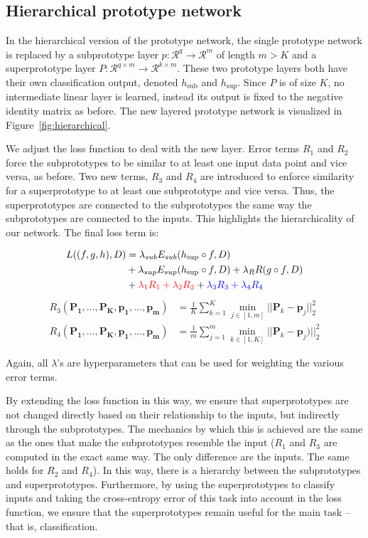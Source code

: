 \subsection{Hierarchical prototype network}
In the hierarchical version of the prototype network, the single prototype network is replaced by a subprototype layer $p : \mathcal{R}^q\rightarrow \mathcal{R}^m$ of length $m > K$ and a superprototype layer $P:\mathcal{R}^{q\times m}\rightarrow\mathcal{R}^{k\times m}$. These two prototype layers both have their own classification output, denoted $h_{\text{sub}}$ and $h_{\text{sup}}$. Since $P$ is of size $K$, no intermediate linear layer is learned, instead its output is fixed to the negative identity matrix as before. The new layered prototype network is visualized in Figure~\ref{fig:hierarchical}. 


We adjust the loss function to deal with the new layer. Error terms $R_1$ and $R_2$ force the subprototypes to be similar to at least one input data point and vice versa, as before. Two new terms, $R_3$ and $R_4$ are introduced to enforce similarity for a superprototype to at least one subprototype and vice versa. Thus, the superprototypes are connected to the subprototypes the same way the subprototypes are connected to the inputs. This highlights the hierarchicality of our network. The final loss term is:

\begin{align*}
    L((f,g,h),D) &= \lambda_{sub} E_{sub}(h_{\text{sup}} \circ f, D)\\ &+ \lambda_{sup} E_{sup}(h_{\text{sup}} \circ f, D) 
    + \lambda_R R(g \circ f,D)\\ &+ {\color{red}\lambda_1 R_1 + \lambda_2 R_2}  + {\color{blue}\lambda_3 R_3 + \lambda_4 R_4}
\end{align*}
\begin{align*}
    R_3(\bm{P_1}, \dots, \bm{P_K}, \bm{p_1}, \dots, \bm{p_m}) &= \frac{1}{K}\sum_{k=1}^K \min_{j\in [1,m]}||\bm{P}_k- \bm{p}_j||^2_2 \\
     R_4(\bm{P_1}, \dots, \bm{P_K}, \bm{p_1}, \dots, \bm{p_m}) &= \frac{1}{m}\sum_{j=1}^m \min_{k\in [1,K]}||\bm{P}_k- \bm{p}_j)||^2_2
 \end{align*}

Again, all $\lambda$'s are hyperparameters that can be used for weighting the various error terms.

By extending the loss function in this way, we ensure that superprototypes are not changed directly based on their relationship to the inputs, but indirectly through the subprototypes. The mechanics by which this is achieved are the same as the ones that make the subprototypes resemble the input ($R_1$ and $R_3$ are computed in the exact same way. The only difference are the inputs. The same holds for $R_2$ and $R_4$). In this way, there is a hierarchy between the subprototypes and superprototypes. Furthermore, by using the superprototypes to classify inputs and taking the cross-entropy error of this task into account in the loss function, we ensure that the superprototypes remain useful for the main task -- that is, classification. 

